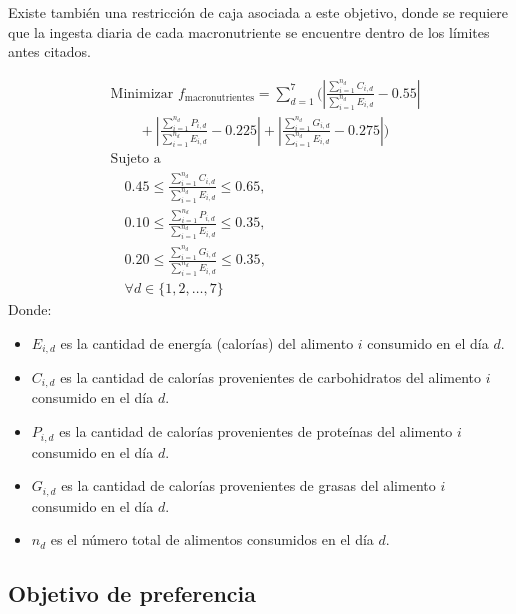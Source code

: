 Existe también una restricción de caja asociada a este objetivo, donde se requiere que la ingesta diaria de cada macronutriente se encuentre dentro de los límites antes citados.
\begin{small}
    \[
    \begin{aligned}
    & \text{Minimizar } f_{\text{macronutrientes}} = \sum_{d=1}^{7} \Bigg( \left| \frac{\sum_{i=1}^{n_d} C_{i,d}}{\sum_{i=1}^{n_d} E_{i,d}} - 0.55 \right| \\
    & \qquad + \left| \frac{\sum_{i=1}^{n_d} P_{i,d}}{\sum_{i=1}^{n_d} E_{i,d}} - 0.225 \right| + \left| \frac{\sum_{i=1}^{n_d} G_{i,d}}{\sum_{i=1}^{n_d} E_{i,d}} - 0.275 \right| \Bigg) \\
    & \text{Sujeto a } \\
    & \quad 0.45 \leq \frac{\sum_{i=1}^{n_d} C_{i,d}}{\sum_{i=1}^{n_d} E_{i,d}} \leq 0.65, \\
    & \quad 0.10 \leq \frac{\sum_{i=1}^{n_d} P_{i,d}}{\sum_{i=1}^{n_d} E_{i,d}} \leq 0.35, \\
    & \quad 0.20 \leq \frac{\sum_{i=1}^{n_d} G_{i,d}}{\sum_{i=1}^{n_d} E_{i,d}} \leq 0.35, \\
    & \quad \forall d \in \{1, 2, \ldots, 7\}
    \end{aligned}
    \]
\newpage
        Donde:
        \begin{itemize}
        \item \( E_{i,d} \) es la cantidad de energía (calorías) del alimento \( i \) consumido en el día \( d \).
        \item \( C_{i,d} \) es la cantidad de calorías provenientes de carbohidratos del alimento \( i \) consumido en el día \( d \).
        \item \( P_{i,d} \) es la cantidad de calorías provenientes de proteínas del alimento \( i \) consumido en el día \( d \).
        \item \( G_{i,d} \) es la cantidad de calorías provenientes de grasas del alimento \( i \) consumido en el día \( d \).
        \item \( n_d \) es el número total de alimentos consumidos en el día \( d \).
        \end{itemize}
\end{small}

\subsection{Objetivo de preferencia}


